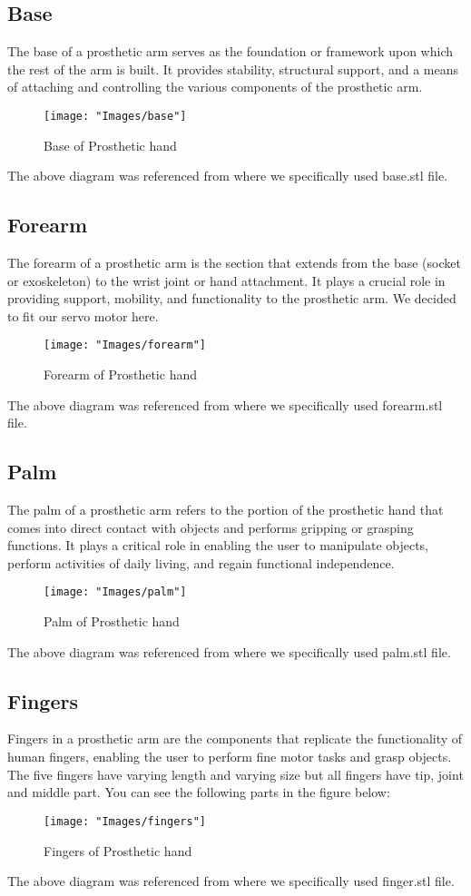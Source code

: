 \subsection{Base}
The base of a prosthetic arm serves as the foundation or framework upon which the rest of the arm is built. It provides stability, structural support, and a means of attaching and controlling the various components of the prosthetic arm.
\begin{figure}[H]   \centering
	\texttt{[image: "Images/base"]}
	\caption{Base of Prosthetic hand}
	\label{fig:Base of Prosthetic hand}
\end{figure}
The above diagram was referenced from \cite{bionicarm} where we specifically used base.stl file.
\par 
\subsection{Forearm}
The forearm of a prosthetic arm is the section that extends from the base (socket or exoskeleton) to the wrist joint or hand attachment. It plays a crucial role in providing support, mobility, and functionality to the prosthetic arm. We decided to fit our servo motor here.
\begin{figure}[H]   \centering
	\texttt{[image: "Images/forearm"]}
	\caption{Forearm of Prosthetic hand}
	\label{fig:Forearm of Prosthetic hand}
\end{figure}
The above diagram was referenced from \cite{bionicarm} where we specifically used forearm.stl file.

\subsection{Palm}
The palm of a prosthetic arm refers to the portion of the prosthetic hand that comes into direct contact with objects and performs gripping or grasping functions. It plays a critical role in enabling the user to manipulate objects, perform activities of daily living, and regain functional independence. 
\begin{figure}[H]   \centering
	\texttt{[image: "Images/palm"]}
	\caption{Palm of Prosthetic hand}
	\label{fig:Palm of Prosthetic hand}
\end{figure}
The above diagram was referenced from \cite{bionicarm} where we specifically used palm.stl file.

\subsection{Fingers}
Fingers in a prosthetic arm are the components that replicate the functionality of human fingers, enabling the user to perform fine motor tasks and grasp objects. The five fingers have varying length and varying size but all fingers have tip, joint and middle part. You can see the following parts in the figure below:
\begin{figure}[H]   \centering
	\texttt{[image: "Images/fingers"]}
	\caption{Fingers of Prosthetic hand}
	\label{fig:Fingers of Prosthetic hand}
\end{figure}
The above diagram was referenced from \cite{bionicarm} where we specifically used finger.stl file.